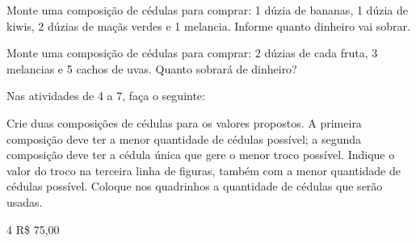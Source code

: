 \begin{escolha}[itemsep=-5pt]
\item Monte uma composição de cédulas para comprar: 1 dúzia de bananas, 1 dúzia de kiwis, 2 dúzias de maçãs verdes e 1 melancia. Informe quanto dinheiro vai sobrar.
\hfill
\reduline{\mbox{}\hfill}

\reduline{\mbox{}\hfill}

\reduline{\mbox{}\hfill}

\item Monte uma composição de cédulas para comprar: 2 dúzias de cada fruta, 3 melancias e 5 cachos de uvas. Quanto sobrará de dinheiro?
\hfill
\reduline{\mbox{}\hfill}

\reduline{\mbox{}\hfill}

\reduline{\mbox{}\hfill}
\end{escolha}

\pagebreak
Nas atividades de 4 a 7, faça o seguinte:

Crie duas composições de cédulas para os valores propostos. A primeira composição deve ter a menor quantidade de cédulas possível; a segunda composição deve ter a cédula única que gere o menor troco possível. Indique o valor do troco na terceira linha de figuras, também com a menor quantidade de cédulas possível. Coloque nos quadrinhos a quantidade de cédulas que serão usadas.



\num{4} R\$ 75,00

